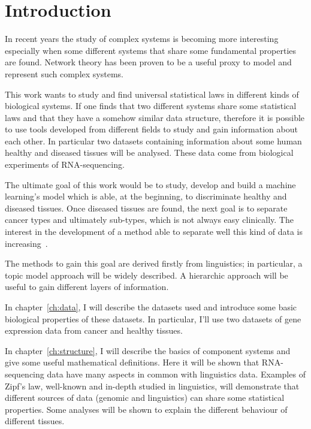 \chapter*{Introduction}\label{ch:intro}
In recent years the study of complex systems is becoming more interesting especially when some different systems that share  some fundamental properties are found. Network theory has been proven to be a useful proxy to model and represent such complex systems.

This work wants to study and find universal statistical laws in different kinds of biological systems. If one finds that two different systems share some statistical laws and that they have a somehow similar data structure, therefore it is possible to use tools developed from different fields to study and gain information about each other. In particular two datasets containing information about some human healthy and diseased tissues will be analysed. These data come from biological experiments of RNA-sequencing.

The ultimate goal of this work would be to study, develop and build a machine learning's model which is able, at the beginning, to discriminate healthy and diseased tissues. Once diseased tissues are found, the next goal is to separate cancer types and ultimately sub-types, which is not always easy clinically. The interest in the development of a method able to separate well this kind of data is increasing~\cite{Farver2018}.

The methods to gain this goal are derived firstly from linguistics; in particular, a topic model approach will be widely described. A hierarchic approach will be useful to gain different layers of information.

In chapter~\ref{ch:data}, I will describe the datasets used and introduce some basic biological properties of these datasets. In particular, I'll use two datasets of gene expression data from cancer and healthy tissues.

In chapter~\ref{ch:structure}, I will describe the basics of component systems and give some useful mathematical definitions. Here it will be shown that RNA-sequencing data have many aspects in common with linguistics data. Examples of Zipf's law, well-known and in-depth studied in linguistics, will demonstrate that different sources of data (genomic and linguistics) can share some statistical properties. Some analyses will be shown to explain the different behaviour of different tissues.

